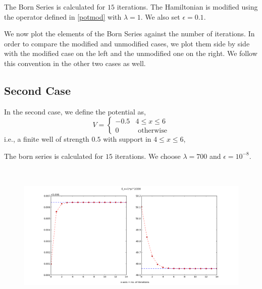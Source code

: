 \documentclass[a4paper,10pt]{report}
\begin{document}
The Born Series is calculated for $15$ iterations. The Hamiltonian is modified using the operator defined in \eqref{potmod} with
$\lambda=1$.  We also set $\epsilon=0.1$. 

We now plot the elements of the Born Series against the number of iterations. In order
to compare the modified and unmodified cases, we plot them side by side with the modified case on the left and the unmodified one
on the right. We follow this convention in the other two cases as well.

\subsection{Second Case}
In the second case, we define the potential as, 
\begin{equation}\label{potentialdef2}
V = \begin{cases}
-0.5 &\mbox{} 4\leq x\leq 6\\
0 &\mbox{ otherwise}
\end{cases} 
\end{equation}
i.e., a finite well of strength $0.5$ with support in $4 \leq x \leq 6$,

The born series is calculated for $15$ iterations. We choose $\lambda=700$ and $\epsilon=10^{-8}$.

\begin{center}
\begin{figure}[lht]
\includegraphics[width=360pt, height=200pt]{series2a.png}
\end{figure}
\end{center}
\end{document}
